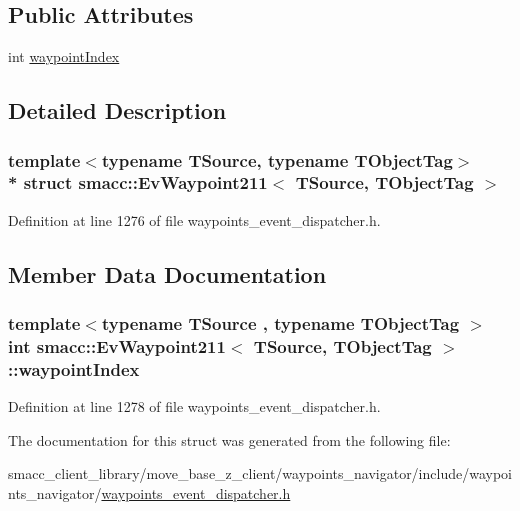 \subsection*{Public Attributes}
\begin{DoxyCompactItemize}
\item 
int \hyperlink{structsmacc_1_1EvWaypoint211_a4c139ff0bdceeddc6d49ffe011706783}{waypoint\+Index}
\end{DoxyCompactItemize}


\subsection{Detailed Description}
\subsubsection*{template$<$typename T\+Source, typename T\+Object\+Tag$>$\\*
struct smacc\+::\+Ev\+Waypoint211$<$ T\+Source, T\+Object\+Tag $>$}



Definition at line 1276 of file waypoints\+\_\+event\+\_\+dispatcher.\+h.



\subsection{Member Data Documentation}
\subsubsection[{\texorpdfstring{waypoint\+Index}{waypointIndex}}]{\setlength{\rightskip}{0pt plus 5cm}template$<$typename T\+Source , typename T\+Object\+Tag $>$ int {\bf smacc\+::\+Ev\+Waypoint211}$<$ T\+Source, T\+Object\+Tag $>$\+::waypoint\+Index}\hypertarget{structsmacc_1_1EvWaypoint211_a4c139ff0bdceeddc6d49ffe011706783}{}\label{structsmacc_1_1EvWaypoint211_a4c139ff0bdceeddc6d49ffe011706783}


Definition at line 1278 of file waypoints\+\_\+event\+\_\+dispatcher.\+h.



The documentation for this struct was generated from the following file\+:\begin{DoxyCompactItemize}
\item 
smacc\+\_\+client\+\_\+library/move\+\_\+base\+\_\+z\+\_\+client/waypoints\+\_\+navigator/include/waypoints\+\_\+navigator/\hyperlink{waypoints__event__dispatcher_8h}{waypoints\+\_\+event\+\_\+dispatcher.\+h}\end{DoxyCompactItemize}
